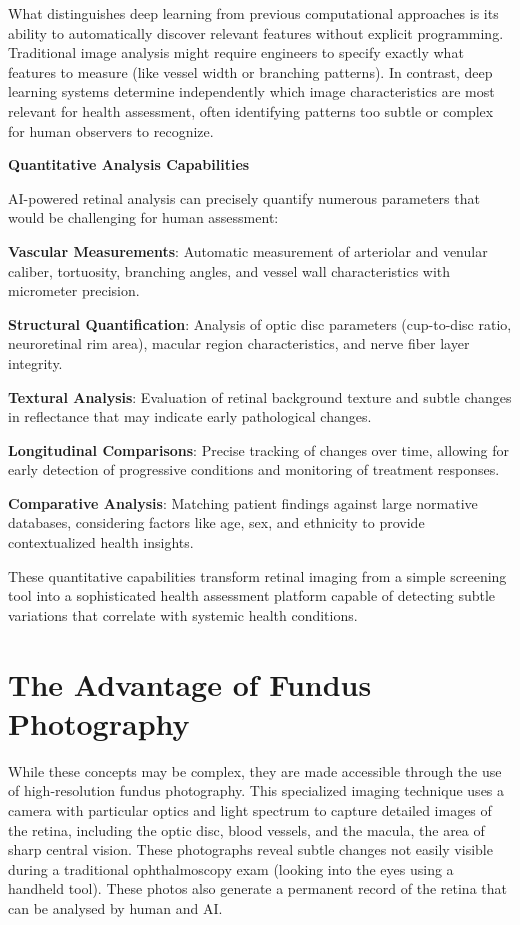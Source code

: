 \documentclass[
  Letterpaper,
]{scrbook}
\begin{document}
What distinguishes deep learning from previous computational approaches
is its ability to automatically discover relevant features without
explicit programming. Traditional image analysis might require engineers
to specify exactly what features to measure (like vessel width or
branching patterns). In contrast, deep learning systems determine
independently which image characteristics are most relevant for health
assessment, often identifying patterns too subtle or complex for human
observers to recognize.

\textbf{Quantitative Analysis Capabilities}

AI-powered retinal analysis can precisely quantify numerous parameters
that would be challenging for human assessment:

\textbf{Vascular Measurements}: Automatic measurement of arteriolar and
venular caliber, tortuosity, branching angles, and vessel wall
characteristics with micrometer precision.

\textbf{Structural Quantification}: Analysis of optic disc parameters
(cup-to-disc ratio, neuroretinal rim area), macular region
characteristics, and nerve fiber layer integrity.

\textbf{Textural Analysis}: Evaluation of retinal background texture and
subtle changes in reflectance that may indicate early pathological
changes.

\textbf{Longitudinal Comparisons}: Precise tracking of changes over
time, allowing for early detection of progressive conditions and
monitoring of treatment responses.

\textbf{Comparative Analysis}: Matching patient findings against large
normative databases, considering factors like age, sex, and ethnicity to
provide contextualized health insights.

These quantitative capabilities transform retinal imaging from a simple
screening tool into a sophisticated health assessment platform capable
of detecting subtle variations that correlate with systemic health
conditions.

\section{The Advantage of Fundus
Photography}\label{the-advantage-of-fundus-photography}

While these concepts may be complex, they are made accessible through
the use of high-resolution fundus photography. This specialized imaging
technique uses a camera with particular optics and light spectrum to
capture detailed images of the retina, including the optic disc, blood
vessels, and the macula, the area of sharp central vision. These
photographs reveal subtle changes not easily visible during a
traditional ophthalmoscopy exam (looking into the eyes using a handheld
tool). These photos also generate a permanent record of the retina that
can be analysed by human and AI.
\end{document}
